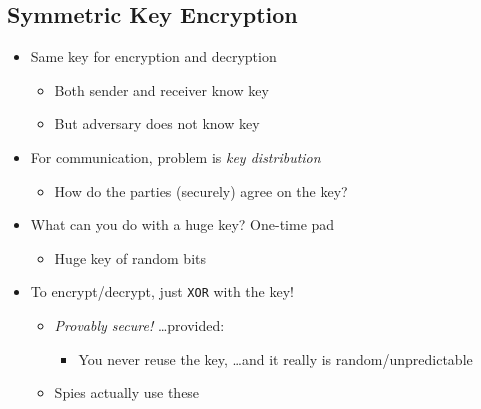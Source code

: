 \subsection{Symmetric Key Encryption}
\begin{itemize}[nosep]
    \item Same key for encryption and decryption
          \begin{itemize}[nosep]
              \item Both sender and receiver know key
              \item But adversary does not know key
          \end{itemize}
    \item For communication, problem is \emph{key distribution}
          \begin{itemize}[nosep]
              \item How do the parties (securely) agree on the key?
          \end{itemize}
    \item What can you do with a huge key? One-time pad
          \begin{itemize}[nosep]
              \item Huge key of random bits
          \end{itemize}
    \item To encrypt/decrypt, just \texttt{XOR} with the key!
          \begin{itemize}[nosep]
              \item \emph{Provably secure!} \dots provided:
                    \begin{itemize}[nosep]
                        \item You never reuse the key, \dots and it really is random/unpredictable
                    \end{itemize}
              \item Spies actually use these
          \end{itemize}
\end{itemize}


